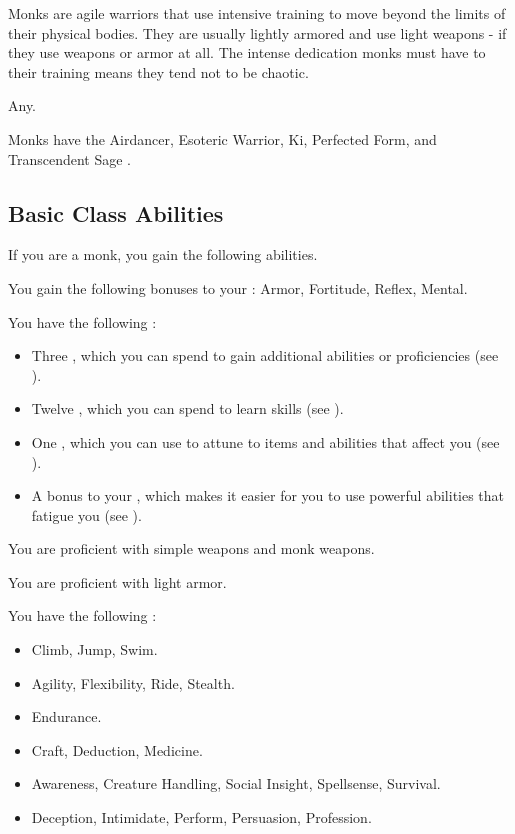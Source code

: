     Monks are agile warriors that use intensive training to move beyond the limits of their physical bodies.
    They are usually lightly armored and use light weapons - if they use weapons or armor at all.
    The intense dedication monks must have to their training means they tend not to be chaotic.

     Any.

     Monks have the Airdancer, Esoteric Warrior, Ki, Perfected Form, and Transcendent Sage .

    \subsection{Basic Class Abilities}
        If you are a monk, you gain the following abilities.

        You gain the following bonuses to your :  Armor,  Fortitude,  Reflex,  Mental.

         You have the following :
        \begin{itemize}
            \item Three , which you can spend to gain additional abilities or proficiencies (see ).
            \item Twelve , which you can spend to learn skills (see ).
            \item One , which you can use to attune to items and abilities that affect you (see ).
            \item A  bonus to your , which makes it easier for you to use powerful abilities that fatigue you (see ).
        \end{itemize}

        You are proficient with simple weapons and monk weapons.

        You are proficient with light armor.

        You have the following :
        \begin{itemize}
            \item {} Climb, Jump, Swim.
            \item {} Agility, Flexibility, Ride, Stealth.
            \item {} Endurance.
            \item {} Craft, Deduction, Medicine.
            \item {} Awareness, Creature Handling, Social Insight, Spellsense, Survival.
            \item {} Deception, Intimidate, Perform, Persuasion, Profession.
        \end{itemize}

